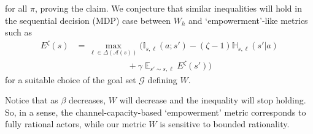 \documentclass[letterpaper]{article} %
\DeclareMathOperator*{\E}{\mathbb{E}}
\def\A{\mathcal{A}}
\def\G{\mathcal{G}}
\def\entropy{\mathbb{H}} %
\def\MI{\mathbb{I}} %
\begin{document}
for all $\pi$, proving the claim.
We conjecture that similar inequalities will hold in the sequential decision (MDP) case between $W_h$ and `empowerment'-like metrics such as
\begin{align*}
    E^\zeta(s) &= \max_{\ell\in\Delta(\A(s))} \Big(
        \MI_{s,\ell}(a; s') - (\zeta-1)\entropy_{s,\ell}(s'|a) \\
        &\qquad\qquad\qquad + \gamma\E_{s'\sim s,\ell} E^\zeta(s')    
    \Big)
\end{align*}
for a suitable choice of the goal set $\G$ defining $W$.

Notice that as $\beta$ decreases, $W$ will decrease and the inequality will stop holding.
So, in a sense, the channel-capacity-based `empowerment' metric corresponds to fully rational actors,
while our metric $W$ is sensitive to bounded rationality.
\end{document}
